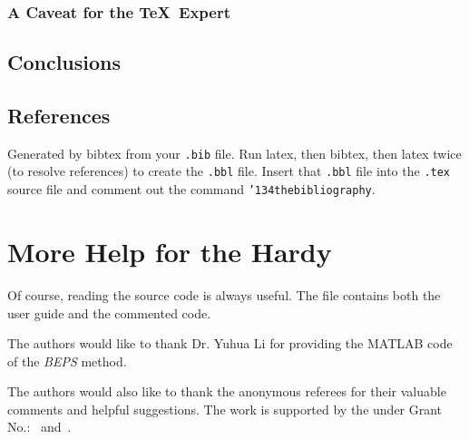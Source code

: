 \subsubsection*{A Caveat for the \TeX\ Expert}
\subsection{Conclusions}
\subsection{References}
Generated by bibtex from your \texttt{.bib} file.  Run latex,
then bibtex, then latex twice (to resolve references)
to create the \texttt{.bbl} file.  Insert that \texttt{.bbl}
file into the \texttt{.tex} source file and comment out
the command \texttt{{\char'134}thebibliography}.
\section{More Help for the Hardy}

Of course, reading the source code is always useful.  The file
 contains both the user guide and the commented
code.

\begin{acks}
  The authors would like to thank Dr. Yuhua Li for providing the
  MATLAB code of the \textit{BEPS} method.

  The authors would also like to thank the anonymous referees for
  their valuable comments and helpful suggestions. The work is
  supported by the  under Grant
  No.:~
  and~.

\end{acks}
